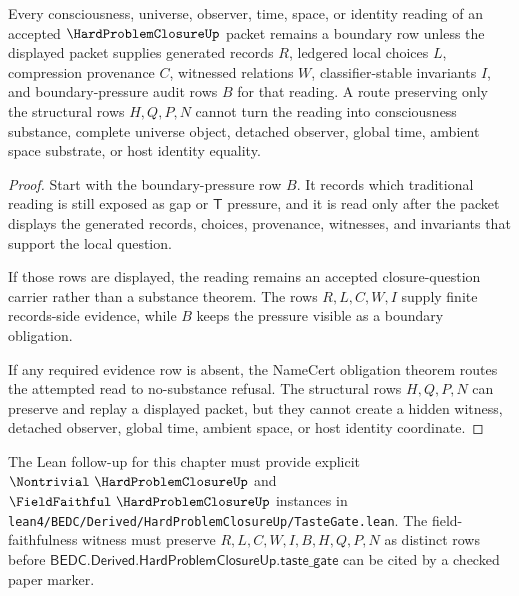\begin{theorem}
\label{thm:hard-problem-closure-boundary-exposure}
Every consciousness, universe, observer, time, space, or identity reading of an accepted $\HardProblemClosureUp$ packet remains a boundary row unless the displayed packet supplies generated records $R$, ledgered local choices $L$, compression provenance $C$, witnessed relations $W$, classifier-stable invariants $I$, and boundary-pressure audit rows $B$ for that reading. A route preserving only the structural rows $H,Q,P,N$ cannot turn the reading into consciousness substance, complete universe object, detached observer, global time, ambient space substrate, or host identity equality.
\end{theorem}
\begin{proof}
Start with the boundary-pressure row $B$. It records which traditional reading is still exposed as gap or $\mathsf{T}$ pressure, and it is read only after the packet displays the generated records, choices, provenance, witnesses, and invariants that support the local question.

If those rows are displayed, the reading remains an accepted closure-question carrier rather than a substance theorem. The rows $R,L,C,W,I$ supply finite records-side evidence, while $B$ keeps the pressure visible as a boundary obligation.

If any required evidence row is absent, the NameCert obligation theorem routes the attempted read to no-substance refusal. The structural rows $H,Q,P,N$ can preserve and replay a displayed packet, but they cannot create a hidden witness, detached observer, global time, ambient space, or host identity coordinate.
\end{proof}



The Lean follow-up for this chapter must provide explicit $\Nontrivial\ \HardProblemClosureUp$ and $\FieldFaithful\ \HardProblemClosureUp$ instances in \texttt{lean4/BEDC/Derived/HardProblemClosureUp/TasteGate.lean}. The field-faithfulness witness must preserve $R,L,C,W,I,B,H,Q,P,N$ as distinct rows before $\mathsf{BEDC.Derived.HardProblemClosureUp.taste\_gate}$ can be cited by a checked paper marker.


